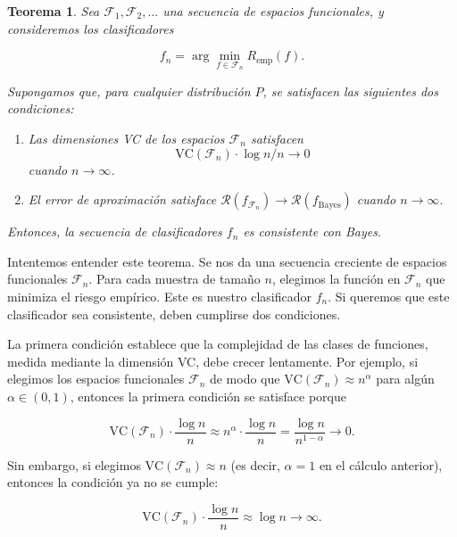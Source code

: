 \documentclass{report}
\newtheorem{thm}{Teorema}[section]
\begin{document}
\begin{thm}
 Sea \(\mathcal{F}_1, \mathcal{F}_2, \dots\) una secuencia de espacios funcionales, y 
consideremos los clasificadores 

\[
f_n = \arg\min_{f \in \mathcal{F}_n} R_{\text{emp}}(f).
\]

Supongamos que, para cualquier distribución \(P\), se satisfacen las siguientes dos condiciones:

\begin{enumerate}
    \item Las dimensiones VC de los espacios \(\mathcal{F}_n\) satisfacen 
    \[
    \text{VC}(\mathcal{F}_n) \cdot \log n / n \to 0
    \]
    cuando \(n \to \infty\).
    
    \item El error de aproximación satisface \(\mathcal{R}(f_{\mathcal{F}_n}) \to \mathcal{R}(f_{\text{Bayes}})\) 
    cuando \(n \to \infty\).
\end{enumerate}

Entonces, la secuencia de clasificadores \(f_n\) es consistente con Bayes.

\end{thm}
\vspace{0.3cm}

Intentemos entender este teorema. Se nos da una secuencia creciente de espacios funcionales \(\mathcal{F}_n\). 
Para cada muestra de tamaño \(n\), elegimos la función en \(\mathcal{F}_n\) que minimiza el riesgo empírico. 
Este es nuestro clasificador \(f_n\). Si queremos que este clasificador sea consistente, deben cumplirse dos 
condiciones.\newline

La primera condición establece que la complejidad de las clases de funciones, medida mediante la dimensión VC, 
debe crecer lentamente. Por ejemplo, si elegimos los espacios funcionales \(\mathcal{F}_n\) de modo que 
\(\text{VC}(\mathcal{F}_n) \approx n^\alpha\) para algún \(\alpha \in (0,1)\), entonces la primera condición 
se satisface porque

\[
\text{VC}(\mathcal{F}_n) \cdot \frac{\log n}{n} \approx n^\alpha \cdot \frac{\log n}{n} = \frac{\log n}{n^{1-\alpha}} \to 0.
\]

Sin embargo, si elegimos \(\text{VC}(\mathcal{F}_n) \approx n\) (es decir, \(\alpha = 1\) en el cálculo anterior), 
entonces la condición ya no se cumple:

\[
\text{VC}(\mathcal{F}_n) \cdot \frac{\log n}{n} \approx \log n \to \infty.
\]
\end{document}
